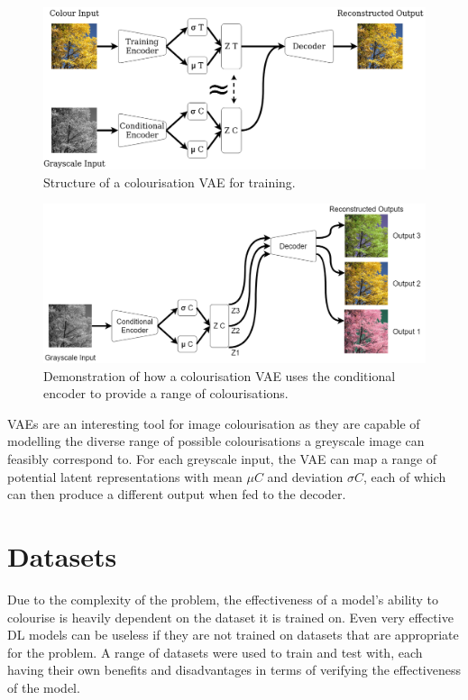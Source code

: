 \documentclass{l4proj}
\begin{document}
\begin{figure}[H]
    \centering
    \includegraphics[width=1.0\linewidth]{images/VAETraining.png}    

    \caption{Structure of a colourisation VAE for training.}

    \label{fig:vaetrain} 
\end{figure}
\begin{figure}[H]
    \centering
    \includegraphics[width=1.0\linewidth]{images/VAETesting.png}    

    \caption{Demonstration of how a colourisation VAE uses the conditional encoder to provide a range of colourisations.}

    \label{fig:vaetest} 
\end{figure}

VAEs are an interesting tool for image colourisation as they are capable of modelling the diverse range of possible colourisations a greyscale image can feasibly correspond to. For each greyscale input, the VAE can map a range of potential latent representations with mean $\mu C$ and deviation $\sigma C$, each of which can then produce a different output when fed to the decoder. 

\section{Datasets}
Due to the complexity of the problem, the effectiveness of a model's ability to colourise is heavily dependent on the dataset it is trained on. Even very effective DL models can be useless if they are not trained on datasets that are appropriate for the problem. A range of datasets were used to train and test with, each having their own benefits and disadvantages in terms of verifying the effectiveness of the model.
\end{document}
